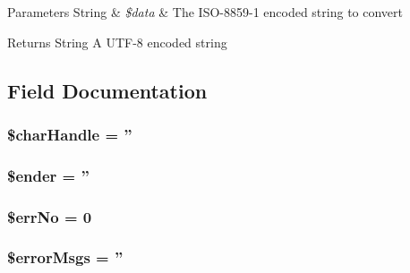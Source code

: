 \begin{DoxyParams}[1]{Parameters}
String & {\em \$data} & The ISO-\/8859-\/1 encoded string to convert \\
\hline
\end{DoxyParams}
\begin{DoxyReturn}{Returns}
String A UTF-\/8 encoded string 
\end{DoxyReturn}


\subsection{Field Documentation}
\hypertarget{classSAVI__Parser_a5a878b1c34cc555349cbc4acbcdd54e7}{
\subsubsection[{\$charHandle}]{\setlength{\rightskip}{0pt plus 5cm}\$charHandle = ''}}
\label{classSAVI__Parser_a5a878b1c34cc555349cbc4acbcdd54e7}
\hypertarget{classSAVI__Parser_accbd2f26bb805e2a243cab5498237ac8}{
\subsubsection[{\$ender}]{\setlength{\rightskip}{0pt plus 5cm}\$ender = ''}}
\label{classSAVI__Parser_accbd2f26bb805e2a243cab5498237ac8}
\hypertarget{classSAVI__Parser_a63d046010fb22e14107bd3861e1d9dd5}{
\subsubsection[{\$errNo}]{\setlength{\rightskip}{0pt plus 5cm}\$errNo = 0}}
\label{classSAVI__Parser_a63d046010fb22e14107bd3861e1d9dd5}
\hypertarget{classSAVI__Parser_af21b3b8a4d4bcfa682cd5f411e0eb566}{
\subsubsection[{\$errorMsgs}]{\setlength{\rightskip}{0pt plus 5cm}\$errorMsgs = ''}}
